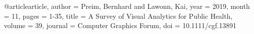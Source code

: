 @article{article,
author = {Preim, Bernhard and Lawonn, Kai},
year = {2019},
month = {11},
pages = {1-35},
title = {A Survey of Visual Analytics for Public Health},
volume = {39},
journal = {Computer Graphics Forum},
doi = {10.1111/cgf.13891}
}